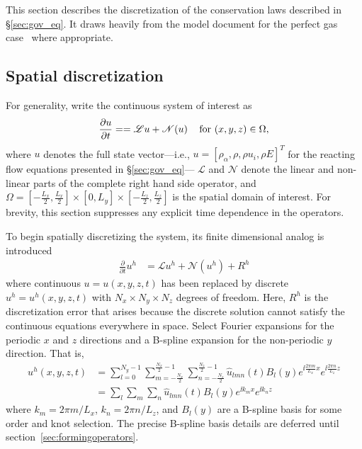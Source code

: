 This section describes the discretization of the conservation laws
described in \S\ref{sec:gov_eq}.  It draws heavily from the model
document for the perfect gas case~\cite{?} where appropriate.

\subsection{Spatial discretization}
For generality, write the continuous system of interest as
%
\begin{equation*}
\frac{\partial u}{\partial t} = = \mathscr{L}u + \mathscr{N}\!\left(u\right) \quad \mathrm{for} \,\, (x,y,z) \in \Omega,
\end{equation*}
% 
where $u$ denotes the full state vector---i.e., $u = [\rho_{\alpha},
  \rho, \rho u_i, \rho E]^T$ for the reacting flow equations presented
in \S\ref{sec:gov_eq}--- $\mathscr{L}$ and $\mathscr{N}$ denote the
linear and non-linear parts of the complete right hand side operator,
and $\Omega = \left[-\frac{L_x}{2},\frac{L_x}{2}\right] \times{}
[0,L_y] \times{} \left[-\frac{L_z}{2},\frac{L_z}{2}\right]$ is the
spatial domain of interest.  For brevity, this section suppresses any
explicit time dependence in the operators.

To begin spatially discretizing the system, its finite dimensional
analog is introduced
%
\begin{align}
  \frac{\partial}{\partial{}t} u^h
  &=
  \mathscr{L}u^h + \mathscr{N}\!\left(u^h\right) + R^h
  \label{eq:discrete_system_with_residual}
\end{align}
where continuous $u = u\!\left(x,y,z,t\right)$ has been replaced by discrete
$u^h = u^h\!\left(x,y,z,t\right)$ with $N_x\times{}N_y\times{}N_z$ degrees of
freedom.  Here, $R^h$ is the discretization error that arises because the
discrete solution cannot satisfy the continuous equations everywhere in space.
Select Fourier expansions for the periodic $x$ and $z$ directions and a
B-spline expansion for the non-periodic $y$ direction.  That is,
\begin{align}
u^h(x,y,z,t)
&=
  \sum_{l=0}^{N_y - 1}
  \sum_{m=-\frac{N_x}{2}}^{\frac{N_x}{2}-1}
  \sum_{n=-\frac{N_z}{2}}^{\frac{N_z}{2}-1}
  \hat{u}_{l m n}(t)
  B_l\!\left(y\right)
  e^{\ii\frac{2\pi{}m}{L_x}x}
  e^{\ii\frac{2\pi{}n}{L_z}z}
  \\
&=
  \sum_{l}\sum_{m}\sum_{n}
  \hat{u}_{l m n}(t)B_l\!\left(y\right)e^{\ii k_m x}e^{\ii k_n z}
  \label{eq:u_h_expansion}
\end{align}
where $k_m = 2\pi{}m/L_x$, $k_n = 2\pi{}n/L_z$, and $B_l\!\left(y\right)$ are a
B-spline basis for some order and knot selection.  The precise B-spline basis
details are deferred until section~\ref{sec:formingoperators}.

